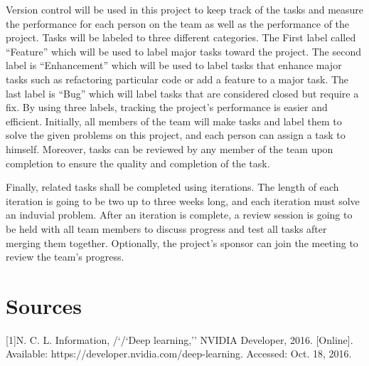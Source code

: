 \documentclass[letterpaper,10pt]{article}
\begin{document}
Version control will be used in this project to keep track of the tasks and measure the performance for each person on the team as well as the performance of the project. Tasks will be labeled to three different categories. The First label called “Feature” which will be used to label major tasks toward the project. The second label is “Enhancement” which will be used to label tasks that enhance major tasks such as refactoring particular code or add a feature to a major task. The last label is “Bug” which will label tasks that are considered closed but require a fix. By using three labels, tracking the project’s performance is easier and efficient. Initially, all members of the team will make tasks and label them to solve the given problems on this project, and each person can assign a task to himself. Moreover, tasks can be reviewed by any member of the team upon completion to ensure the quality and completion of the task.

Finally, related tasks shall be completed using iterations. The length of each iteration is going to be two up to three weeks long, and each iteration must solve an induvial problem. After an iteration is complete, a review session is going to be held with all team members to discuss progress and test all tasks after merging them together. Optionally, the project’s sponsor can join the meeting to review the team's progress.

\section{Sources}

[1]N. C. L. Information, /`/`Deep learning,'' NVIDIA Developer, 2016. [Online]. Available: https://developer.nvidia.com/deep-learning. Accessed: Oct. 18, 2016.
\end{document}
